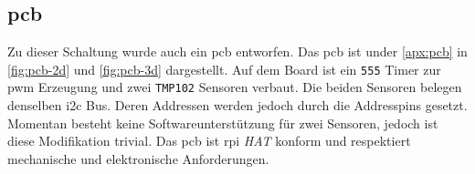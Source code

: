 \subsection{\acrshort{pcb}}

Zu dieser Schaltung wurde auch ein \gls{pcb} entworfen.
Das \gls{pcb} ist under \autoref{apx:pcb} in \autoref{fig:pcb-2d} und \autoref{fig:pcb-3d} dargestellt.
Auf dem Board ist ein \texttt{555} Timer zur \gls{pwm} Erzeugung und zwei \texttt{TMP102} Sensoren verbaut.
Die beiden Sensoren belegen denselben \gls{i2c} Bus.
Deren Addressen werden jedoch durch die Addresspins gesetzt.
Momentan besteht keine Softwareunterstützung für zwei Sensoren, jedoch ist diese Modifikation trivial.
Das \gls{pcb} ist \gls{rpi} \textit{HAT} konform und respektiert mechanische und elektronische Anforderungen.

